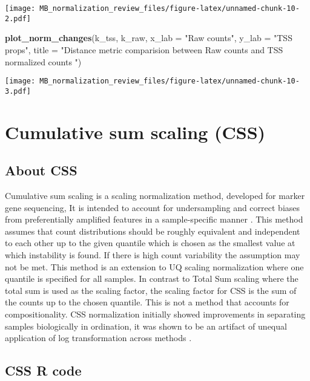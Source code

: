 \documentclass[
]{book}
\newenvironment{Shaded}{\begin{snugshade}}{\end{snugshade}}
\newcommand{\DataTypeTok}[1]{\textcolor[rgb]{0.13,0.29,0.53}{#1}}
\newcommand{\KeywordTok}[1]{\textcolor[rgb]{0.13,0.29,0.53}{\textbf{#1}}}
\newcommand{\NormalTok}[1]{#1}
\newcommand{\StringTok}[1]{\textcolor[rgb]{0.31,0.60,0.02}{#1}}
\begin{document}
\texttt{[image: MB\_normalization\_review\_files/figure-latex/unnamed-chunk-10-2.pdf]}

\begin{Shaded}
\begin{Highlighting}[]
\KeywordTok{plot\_norm\_changes}\NormalTok{(k\_tss, k\_raw,}
                  \DataTypeTok{x\_lab =} \StringTok{"Raw counts"}\NormalTok{, }\DataTypeTok{y\_lab =} \StringTok{"TSS props"}\NormalTok{, }
                  \DataTypeTok{title =} \StringTok{"Distance metric comparision between Raw counts and TSS normalized counts "}\NormalTok{)}
\end{Highlighting}
\end{Shaded}

\texttt{[image: MB\_normalization\_review\_files/figure-latex/unnamed-chunk-10-3.pdf]}

\hypertarget{cumulative-sum-scaling-css}{%
\section{Cumulative sum scaling (CSS)}\label{cumulative-sum-scaling-css}}

\hypertarget{about-css}{%
\subsection{About CSS}\label{about-css}}

Cumulative sum scaling is a scaling normalization method, developed for marker gene sequencing, It is intended to account for undersampling and correct biases from preferentially amplified features in a sample-specific manner \citep{paulson2013}. This method assumes that count distributions should be roughly equivalent and independent to each other up to the given quantile which is chosen as the smallest value at which instability is found. If there is high count variability the assumption may not be met. This method is an extension to UQ scaling normalization where one quantile is specified for all samples. In contrast to Total Sum scaling where the total sum is used as the scaling factor, the scaling factor for CSS is the sum of the counts up to the chosen quantile. This is not a method that accounts for compositionality. CSS normalization initially showed improvements in separating samples biologically in ordination, it was shown to be an artifact of unequal application of log transformation across methods \citep{costea2014}.

\hypertarget{css-r-code}{%
\subsection{CSS R code}\label{css-r-code}}
\end{document}
